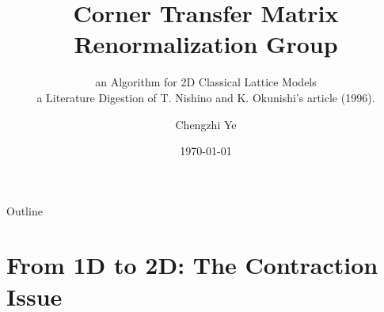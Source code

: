\documentclass[aspectratio=169, 11pt]{beamer}
\title[CTMRG]{\textbf{Corner Transfer Matrix Renormalization Group}}
\subtitle{an Algorithm for 2D Classical Lattice Models\\a Literature Digestion of T. Nishino and K. Okunishi's article (1996).}
\author{Chengzhi Ye}
\institute{ENS de Lyon}
\date{\today}
\begin{document}
\begin{frame}
    \titlepage
\end{frame}

\begin{frame}{Outline}
    \tableofcontents
\end{frame}

\section{From 1D to 2D: The Contraction Issue}
\end{document}
